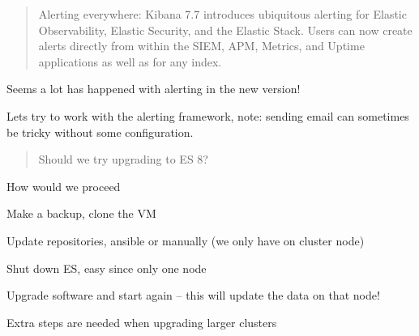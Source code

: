 \documentclass[Screen16to9,17pt]{foils}
\begin{document}
\begin{list2}
\item {\footnotesize{}}
\item {\footnotesize{}}
\item {\footnotesize{}}
\end{list2}




\begin{quote}
Alerting everywhere: Kibana 7.7 introduces ubiquitous alerting for Elastic Observability, Elastic Security, and the Elastic Stack. Users can now create alerts directly from within the SIEM, APM, Metrics, and Uptime applications as well as for any index.
\end{quote}

\begin{list2}
\item Seems a lot has happened with alerting in the new version!
\item Lets try to work with the alerting framework, note: sending email can sometimes be tricky without some configuration.
\end{list2}




\begin{quote}
Should we try upgrading to ES 8?
\end{quote}

How would we proceed
\begin{list2}
\item Make a backup, clone the VM
\item Update repositories, ansible or manually (we only have on cluster node)
\item Shut down ES, easy since only one node
\item Upgrade software and start again -- this will update the data on that node!
\end{list2}

Extra steps are needed when upgrading larger clusters

\end{document}
